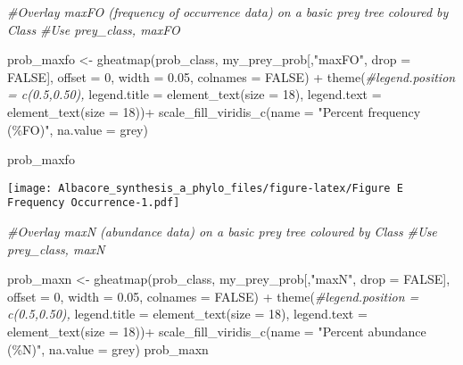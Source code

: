 \documentclass[
]{article}
\newenvironment{Shaded}{\begin{snugshade}}{\end{snugshade}}
\newcommand{\AttributeTok}[1]{\textcolor[rgb]{0.77,0.63,0.00}{#1}}
\newcommand{\CommentTok}[1]{\textcolor[rgb]{0.56,0.35,0.01}{\textit{#1}}}
\newcommand{\ConstantTok}[1]{\textcolor[rgb]{0.00,0.00,0.00}{#1}}
\newcommand{\DecValTok}[1]{\textcolor[rgb]{0.00,0.00,0.81}{#1}}
\newcommand{\FloatTok}[1]{\textcolor[rgb]{0.00,0.00,0.81}{#1}}
\newcommand{\FunctionTok}[1]{\textcolor[rgb]{0.00,0.00,0.00}{#1}}
\newcommand{\NormalTok}[1]{#1}
\newcommand{\OtherTok}[1]{\textcolor[rgb]{0.56,0.35,0.01}{#1}}
\newcommand{\SpecialCharTok}[1]{\textcolor[rgb]{0.00,0.00,0.00}{#1}}
\newcommand{\StringTok}[1]{\textcolor[rgb]{0.31,0.60,0.02}{#1}}
\begin{document}
\begin{Shaded}
\begin{Highlighting}[]
\CommentTok{\#Overlay maxFO (frequency of occurrence data) on a basic prey tree coloured by Class}
\CommentTok{\#Use prey\_class, maxFO}

\NormalTok{prob\_maxfo }\OtherTok{\textless{}{-}} \FunctionTok{gheatmap}\NormalTok{(prob\_class, my\_prey\_prob[,}\StringTok{"maxFO"}\NormalTok{, }\AttributeTok{drop =} \ConstantTok{FALSE}\NormalTok{], }
                       \AttributeTok{offset =} \DecValTok{0}\NormalTok{, }\AttributeTok{width =} \FloatTok{0.05}\NormalTok{, }\AttributeTok{colnames =} \ConstantTok{FALSE}\NormalTok{) }\SpecialCharTok{+}
  \FunctionTok{theme}\NormalTok{(}\CommentTok{\#legend.position = c(0.5,0.50),}
        \AttributeTok{legend.title =} \FunctionTok{element\_text}\NormalTok{(}\AttributeTok{size =} \DecValTok{18}\NormalTok{), }
        \AttributeTok{legend.text =} \FunctionTok{element\_text}\NormalTok{(}\AttributeTok{size =} \DecValTok{18}\NormalTok{))}\SpecialCharTok{+}
  \FunctionTok{scale\_fill\_viridis\_c}\NormalTok{(}\AttributeTok{name =} \StringTok{"Percent frequency (\%FO)"}\NormalTok{, }\AttributeTok{na.value =} \StringTok{\textquotesingle{}grey\textquotesingle{}}\NormalTok{)}

\NormalTok{prob\_maxfo}
\end{Highlighting}
\end{Shaded}

\texttt{[image: Albacore\_synthesis\_a\_phylo\_files/figure-latex/Figure E Frequency Occurrence-1.pdf]}

\begin{Shaded}
\begin{Highlighting}[]
\CommentTok{\#Overlay maxN (abundance data) on a basic prey tree coloured by Class}
\CommentTok{\#Use prey\_class, maxN}

\NormalTok{prob\_maxn }\OtherTok{\textless{}{-}} \FunctionTok{gheatmap}\NormalTok{(prob\_class, my\_prey\_prob[,}\StringTok{"maxN"}\NormalTok{, }\AttributeTok{drop =} \ConstantTok{FALSE}\NormalTok{], }
                      \AttributeTok{offset =} \DecValTok{0}\NormalTok{, }\AttributeTok{width =} \FloatTok{0.05}\NormalTok{, }\AttributeTok{colnames =} \ConstantTok{FALSE}\NormalTok{) }\SpecialCharTok{+}
  \FunctionTok{theme}\NormalTok{(}\CommentTok{\#legend.position = c(0.5,0.50),}
        \AttributeTok{legend.title =} \FunctionTok{element\_text}\NormalTok{(}\AttributeTok{size =} \DecValTok{18}\NormalTok{), }
        \AttributeTok{legend.text =} \FunctionTok{element\_text}\NormalTok{(}\AttributeTok{size =} \DecValTok{18}\NormalTok{))}\SpecialCharTok{+}
  \FunctionTok{scale\_fill\_viridis\_c}\NormalTok{(}\AttributeTok{name =} \StringTok{"Percent abundance (\%N)"}\NormalTok{, }\AttributeTok{na.value =} \StringTok{\textquotesingle{}grey\textquotesingle{}}\NormalTok{)}
\NormalTok{prob\_maxn}
\end{Highlighting}
\end{Shaded}
\end{document}
